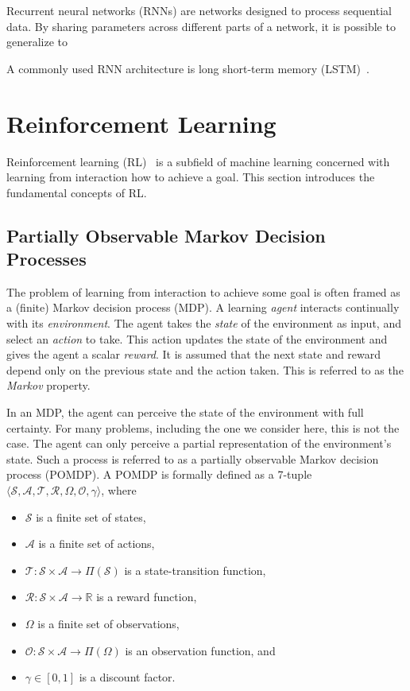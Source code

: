 Recurrent neural networks (RNNs) are networks designed to process sequential data.
By sharing parameters across different parts of a network, it is possible to generalize to 

A commonly used RNN architecture is long short-term memory (LSTM)~\cite{hochreiter_schmidhuber_lstm_1997}.

\section{Reinforcement Learning}

Reinforcement learning (RL)~\cite{sutton_reinforcement_2018} is a subfield of machine learning concerned with learning from interaction how to achieve a goal.
This section introduces the fundamental concepts of RL.

\subsection{Partially Observable Markov Decision Processes}

The problem of learning from interaction to achieve some goal is often framed as a (finite) Markov decision process (MDP).
A learning \textit{agent} interacts continually with its \textit{environment}.
The agent takes the \textit{state} of the environment as input, and select an \textit{action} to take.
This action updates the state of the environment and gives the agent a scalar \textit{reward}.
It is assumed that the next state and reward depend only on the previous state and the action taken.
This is referred to as the \textit{Markov} property.~\cite{kaelbling_pomdp_1998}

In an MDP, the agent can perceive the state of the environment with full certainty.
For many problems, including the one we consider here, this is not the case.
The agent can only perceive a partial representation of the environment's state.
Such a process is referred to as a partially observable Markov decision process (POMDP).
A POMDP is formally defined as a 7-tuple \(\langle \mathcal{S}, \mathcal{A}, \mathcal{T}, \mathcal{R}, \Omega, \mathcal{O}, \gamma \rangle\), where

\begin{itemize}
    \item \(\mathcal{S}\) is a finite set of states,
    \item \(\mathcal{A}\) is a finite set of actions,
    \item \(\mathcal{T}: \mathcal{S} \times \mathcal{A} \rightarrow \Pi(\mathcal{S})\) is a state-transition function,
    \item \(\mathcal{R}: \mathcal{S} \times \mathcal{A} \rightarrow \mathbb{R}\) is a reward function,
    \item \(\Omega\) is a finite set of observations,
    \item \(\mathcal{O}: \mathcal{S} \times \mathcal{A} \rightarrow \Pi(\Omega)\) is an observation function, and
    \item \(\gamma \in [0, 1]\) is a discount factor.
\end{itemize}

